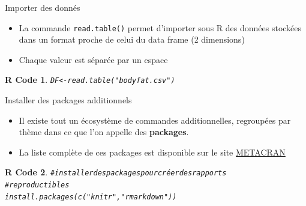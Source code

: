\documentclass[11pt]{beamer}\usepackage[]{graphicx}\usepackage[]{color}
\makeatletter
\newcommand{\hlstr}[1]{\textcolor[rgb]{0.063,0.58,0.627}{#1}}%
\newcommand{\hlcom}[1]{\textcolor[rgb]{0.588,0.588,0.588}{#1}}%
\newcommand{\hlstd}[1]{\textcolor[rgb]{0.196,0.196,0.196}{#1}}%
\newcommand{\hlkwb}[1]{\textcolor[rgb]{0.627,0,0.314}{#1}}%
\newcommand{\hlkwd}[1]{\textcolor[rgb]{0.78,0.227,0.412}{#1}}%
\newenvironment{kframe}{%
 \def\at@end@of@kframe{}%
 \ifinner\ifhmode%
  \def\at@end@of@kframe{\end{minipage}}%
  \begin{minipage}{\columnwidth}%
 \fi\fi%
 \def\FrameCommand##1{\hskip\@totalleftmargin \hskip-\fboxsep
 \colorbox{shadecolor}{##1}\hskip-\fboxsep
     \hskip-\linewidth \hskip-\@totalleftmargin \hskip\columnwidth}%
 \MakeFramed {\advance\hsize-\width
   \@totalleftmargin\z@ \linewidth\hsize
   \@setminipage}}%
 {\par\unskip\endMakeFramed%
 \at@end@of@kframe}
\newenvironment{knitrout}{}{} %
\newtheorem{rcode}{R Code}[section]
\newcommand{\code}[1]{\texttt{#1}}
\makeatother
\begin{document}
\begin{frame}[fragile]{Importer des donnés}

\begin{itemize}
  \setlength\itemsep{2em}
\item La commande \code{read.table()} permet d'importer sous R des données stockées dans un format proche de celui du data frame (2 dimensions)
\pause \item Chaque valeur est séparée par un espace
\end{itemize}

\begin{knitrout}
\color{fgcolor}\begin{kframe}
\begin{rcode}\begin{alltt}
\hlstd{DF} \hlkwb{<-} \hlkwd{read.table}\hlstd{(}\hlstr{"bodyfat.csv"}\hlstd{)}
\end{alltt}
\end{rcode}\end{kframe}
\end{knitrout}
\end{frame}




\begin{frame}[fragile]{Installer des packages additionnels}

\begin{itemize}
  \setlength\itemsep{2em}
\item Il existe tout un écosystème de commandes additionnelles, regroupées par thème dans ce que l'on appelle des \textbf{packages}. 
\item La liste complète de ces packages est disponible sur le site \href{http://www.r-pkg.org/}{METACRAN}
\end{itemize}

\begin{knitrout}
\color{fgcolor}\begin{kframe}
\begin{rcode}\begin{alltt}
\hlcom{# installer des packages pour créer des rapports}
\hlcom{# reproductibles}
\hlkwd{install.packages}\hlstd{(}\hlkwd{c}\hlstd{(}\hlstr{"knitr"}\hlstd{,}\hlstr{"rmarkdown"}\hlstd{))}
\end{alltt}
\end{rcode}\end{kframe}
\end{knitrout}
\end{frame}
\end{document}

